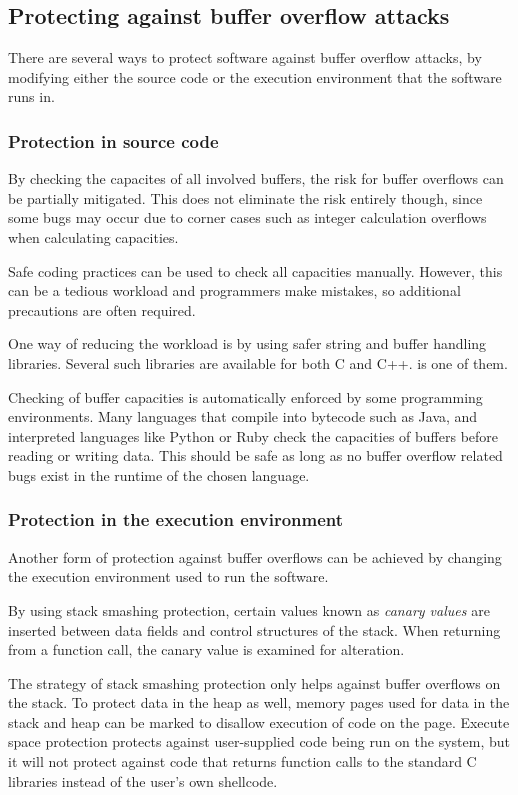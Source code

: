 \subsection{Protecting against buffer overflow attacks}
There are several ways to protect software against buffer overflow attacks,
by modifying either the source code or
the execution environment that the software runs in.

\subsubsection{Protection in source code}
By checking the capacites of all involved buffers,
the risk for buffer overflows can be partially mitigated.
This does not eliminate the risk entirely though,
since some bugs may occur due to corner cases
such as integer calculation overflows when calculating capacities.

Safe coding practices can be used to check all capacities manually.
However, this can be a tedious workload and
programmers make mistakes,
so additional precautions are often required.

One way of reducing the workload is by using
safer string and buffer handling libraries.
Several such libraries are available for both C and C++. 
\strsafe is one of them.

Checking of buffer capacities is automatically enforced
by some programming environments.
Many languages that compile into bytecode such as Java,
and interpreted languages like Python or Ruby
check the capacities of buffers before reading or writing data.
This should be safe as long as no buffer overflow related bugs exist
in the runtime of the chosen language.

\subsubsection{Protection in the execution environment}
Another form of protection against buffer overflows can be achieved
by changing the execution environment used to run the software.

By using stack smashing protection, certain values known as
\emph{canary values} are inserted between data fields and
control structures of the stack.
When returning from a function call,
the canary value is examined for alteration.

The strategy of stack smashing protection only helps against
buffer overflows on the stack.
To protect data in the heap as well,
memory pages used for data in the stack and heap can be marked to
disallow execution of code on the page.
Execute space protection protects against user-supplied code
being run on the system,
but it will not protect against code that returns function calls to
the standard C libraries instead of the user's own shellcode.

